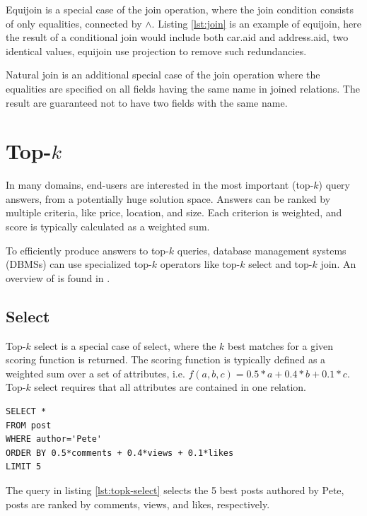Equijoin is a special case of the join operation, where the join
condition consists of only equalities, connected by $\land$. Listing
\ref{lst:join} is an example of equijoin, here the result of a
conditional join would include both car.aid and address.aid, two
identical values, equijoin use projection to remove such redundancies.

Natural join is an additional special case of the join operation where
the equalities are specified on all fields having the same name in
joined relations. The result are guaranteed not to have two fields
with the same name.

\section{Top-$k$}

In many domains, end-users are interested in the most important
(top-$k$) query answers, from a potentially huge solution space.
Answers can be ranked by multiple criteria, like price, location, and
size. Each criterion is weighted, and score is typically calculated as
a weighted sum.

To efficiently produce answers to top-$k$ queries, database management
systems (DBMSs) can use specialized top-$k$ operators like top-$k$ select
and top-$k$ join. An overview of is found in \cite{topksurvey}.

\subsection{Select}

Top-$k$ select is a special case of select, where the $k$ best matches for
a given scoring function is returned. The scoring function is
typically defined as a weighted sum over a set of attributes, i.e.
$f(a,b,c) = 0.5 * a + 0.4 * b + 0.1 * c$. Top-$k$ select requires that
all attributes are contained in one relation.

\begin{minipage}{\textwidth}
\begin{lstlisting}[caption={Top-$k$ select example}, label={lst:topk-select}]
SELECT * 
FROM post
WHERE author='Pete' 
ORDER BY 0.5*comments + 0.4*views + 0.1*likes 
LIMIT 5
\end{lstlisting}
\end{minipage}

The query in listing \ref{lst:topk-select} selects the 5 best posts
authored by Pete, posts are ranked by comments, views, and likes,
respectively.

